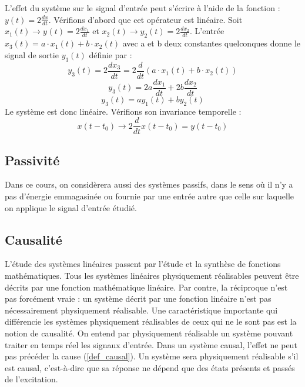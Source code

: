 	
	L'effet du système sur le signal d'entrée peut s'écrire à l'aide de la fonction : $y(t)=2\frac{dx}{dt}$.
	Vérifions d'abord que cet opérateur est linéaire. Soit $ x_{1}(t)\rightarrow y_{}(t)=2\frac{dx_{1}}{dt}$ et  $ x_{2}(t)\rightarrow y_{2}(t)=2\frac{dx_{2}}{dt}$. L'entrée $x_{3}(t)=a\cdot x_{1}(t)+b\cdot x_{2}(t) $ avec a et b deux constantes quelconques donne le signal de sortie $y_{3}(t)$ définie par :
	\begin{equation*}
	y_{3}(t)=2\frac{dx_{3}}{dt}=2\frac{d}{dt}(a\cdot x_{1}(t)+b\cdot x_{2}(t))
	\end{equation*}
	\begin{equation*}
	y_{3}(t)=2a\frac{dx_{1}}{dt}+2b\frac{dx_{2}}{dt}
	\end{equation*}
	\begin{equation*}
	y_{3}(t)=ay_{1}(t)+by_{2}(t)
	\end{equation*}
	Le système est donc linéaire. Vérifions son invariance temporelle :
	\begin{equation*}
	x(t-t_{0}) \rightarrow 2\frac{d}{dt}x(t-t_{0})=y(t-t_{0})
	\end{equation*}
	
	
	\subsection{Passivité}
	Dans ce cours, on considèrera aussi des systèmes passifs, dans le sens où il n'y a pas d'énergie emmagasinée ou fournie par une entrée autre que celle sur laquelle on applique le signal d'entrée étudié.
	\subsection{Causalité}
	L'étude des systèmes linéaires passent par l'étude et la synthèse de fonctions mathématiques. Tous les systèmes linéaires physiquement réalisables peuvent être décrits par une fonction mathématique linéaire. Par contre, la réciproque n'est pas forcément vraie : un système décrit par une fonction linéaire n'est pas nécessairement physiquement réalisable. Une caractéristique importante qui différencie les systèmes physiquement réalisables de ceux qui ne le sont pas est la notion de causalité. On entend par physiquement réalisable un système pouvant traiter en temps réel les signaux d'entrée.
	Dans un système causal, l'effet ne peut pas précéder la cause (\ref{def_causal}). Un système sera physiquement réalisable s'il est causal, c'est-à-dire que sa réponse ne dépend que des états présents et passés de l'excitation.
	
